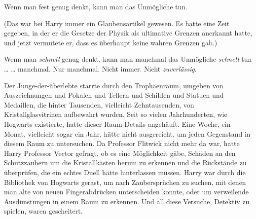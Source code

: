\later

Wenn man fest genug denkt, kann man das Unmögliche tun.

(Das war bei Harry immer ein Glaubensartikel gewesen. Es hatte eine Zeit gegeben, in der er die Gesetze der Physik als ultimative Grenzen anerkannt hatte, und jetzt vermutete er, dass es überhaupt keine wahren Grenzen gab.)




Wenn man \emph{schnell} genug denkt, kann man manchmal das Unmögliche \emph{schnell} tun …
… manchmal. Nur manchmal. Nicht immer. Nicht \emph{zuverlässig}.

Der Junge-der-überlebte starrte durch den Trophäenraum, umgeben von Auszeichnungen und Pokalen und Tellern und Schilden und Statuen und Medaillen, die hinter Tausenden, vielleicht Zehntausenden, von Kristallglasvitrinen aufbewahrt wurden. Seit so vielen Jahrhunderten, wie Hogwarts existierte, hatte dieser Raum Details angehäuft. Eine Woche, ein Monat, vielleicht sogar ein Jahr, hätte nicht ausgereicht, um jeden Gegenstand in diesem Raum zu untersuchen. Da Professor Flitwick nicht mehr da war, hatte Harry Professor Vector gefragt, ob es eine Möglichkeit gäbe, Schäden an den Schutzzaubern um die Kristallkästen herum zu erkennen und die Rückstände zu überprüfen, die ein echtes Duell hätte hinterlassen müssen. Harry war durch die Bibliothek von Hogwarts gerast, um nach Zaubersprüchen zu suchen, mit denen man alte von neuen Fingerabdrücken unterscheiden konnte, oder um verweilende Ausdünstungen in einem Raum zu erkennen. Und all diese Versuche, Detektiv zu spielen, waren gescheitert.


